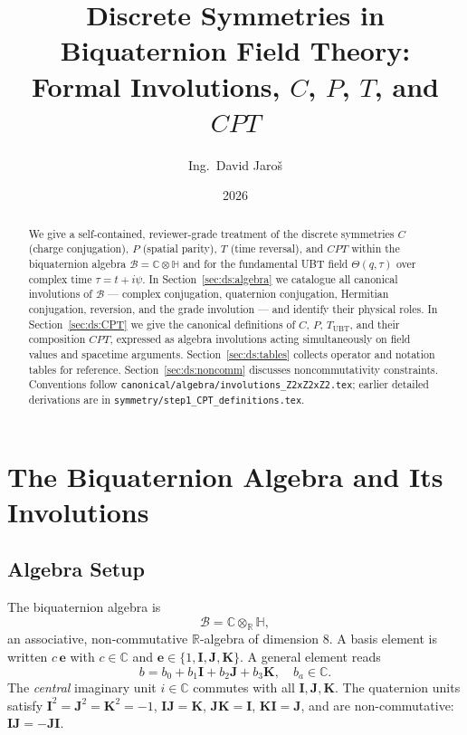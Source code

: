 \documentclass[12pt,a4paper]{article}
\title{\textbf{Discrete Symmetries in Biquaternion Field Theory:\\
                 Formal Involutions, $C$, $P$, $T$, and $CPT$}}
\author{Ing.\ David Jaro\v{s}}
\date{2026}
\theoremstyle{definition}
\theoremstyle{remark}
\begin{document}
  \maketitle

  \begin{abstract}
  We give a self-contained, reviewer-grade treatment of the discrete symmetries
  $C$ (charge conjugation), $P$ (spatial parity), $T$ (time reversal), and
  $CPT$ within the biquaternion algebra $\mathcal{B}=\mathbb{C}\otimes\mathbb{H}$
  and for the fundamental UBT field $\Theta(q,\tau)$ over complex time
  $\tau = t + i\psi$.
  In Section~\ref{sec:ds:algebra} we catalogue all canonical involutions
  of $\mathcal{B}$ — complex conjugation, quaternion conjugation, Hermitian
  conjugation, reversion, and the grade involution — and identify their physical
  roles.
  In Section~\ref{sec:ds:CPT} we give the canonical definitions of $C$, $P$,
  $T_{\mathrm{UBT}}$, and their composition $CPT$, expressed as algebra
  involutions acting simultaneously on field values and spacetime arguments.
  Section~\ref{sec:ds:tables} collects operator and notation tables for
  reference.
  Section~\ref{sec:ds:noncomm} discusses noncommutativity constraints.
  Conventions follow \texttt{canonical/algebra/involutions\_Z2xZ2xZ2.tex};
  earlier detailed derivations are in
  \texttt{symmetry/step1\_CPT\_definitions.tex}.
  \end{abstract}
\fi

\section{The Biquaternion Algebra and Its Involutions}
\label{sec:ds:algebra}

\subsection{Algebra Setup}

The biquaternion algebra is
\begin{equation}
  \mathcal{B} = \mathbb{C} \otimes_{\mathbb{R}} \mathbb{H},
  \label{eq:ds:B}
\end{equation}
an associative, non-commutative $\mathbb{R}$-algebra of dimension $8$.
A basis element is written $c\,\mathbf{e}$ with $c \in \mathbb{C}$ and
$\mathbf{e} \in \{1,\mathbf{I},\mathbf{J},\mathbf{K}\}$.
A general element reads
\begin{equation}
  b = b_0 + b_1\mathbf{I} + b_2\mathbf{J} + b_3\mathbf{K},
  \quad b_a \in \mathbb{C}.
  \label{eq:ds:general}
\end{equation}
The \emph{central} imaginary unit $i\in\mathbb{C}$ commutes with all
$\mathbf{I},\mathbf{J},\mathbf{K}$.  The quaternion units satisfy
$\mathbf{I}^2=\mathbf{J}^2=\mathbf{K}^2=-1$, $\mathbf{I}\mathbf{J}=\mathbf{K}$,
$\mathbf{J}\mathbf{K}=\mathbf{I}$, $\mathbf{K}\mathbf{I}=\mathbf{J}$, and are
non-commutative: $\mathbf{I}\mathbf{J}=-\mathbf{J}\mathbf{I}$.
\end{document}
